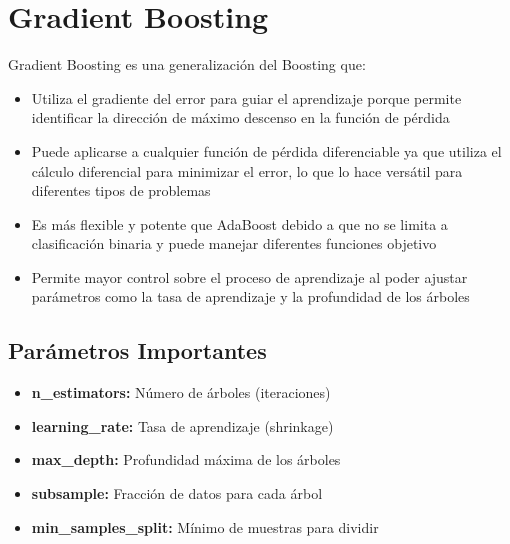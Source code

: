 \documentclass[12pt]{article}
\begin{document}
\section{Gradient Boosting}
Gradient Boosting es una generalización del Boosting que:
\begin{itemize}
    \item Utiliza el gradiente del error para guiar el aprendizaje porque permite identificar la dirección de máximo descenso en la función de pérdida
    \item Puede aplicarse a cualquier función de pérdida diferenciable ya que utiliza el cálculo diferencial para minimizar el error, lo que lo hace versátil para diferentes tipos de problemas
    \item Es más flexible y potente que AdaBoost debido a que no se limita a clasificación binaria y puede manejar diferentes funciones objetivo
    \item Permite mayor control sobre el proceso de aprendizaje al poder ajustar parámetros como la tasa de aprendizaje y la profundidad de los árboles
\end{itemize}

\subsection{Parámetros Importantes}
\begin{itemize}
    \item \textbf{n\_estimators:} Número de árboles (iteraciones)
    \item \textbf{learning\_rate:} Tasa de aprendizaje (shrinkage)
    \item \textbf{max\_depth:} Profundidad máxima de los árboles
    \item \textbf{subsample:} Fracción de datos para cada árbol
    \item \textbf{min\_samples\_split:} Mínimo de muestras para dividir
\end{itemize}
\end{document}
